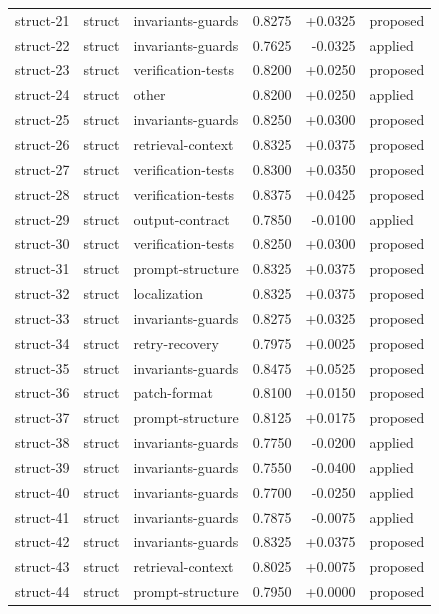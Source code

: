 \begin{center}
\begin{longtable}{llp{5.2cm}rrl}
struct-21 & struct & invariants-guards & 0.8275 & +0.0325 & proposed \\
struct-22 & struct & invariants-guards & 0.7625 & -0.0325 & applied \\
struct-23 & struct & verification-tests & 0.8200 & +0.0250 & proposed \\
struct-24 & struct & other & 0.8200 & +0.0250 & applied \\
struct-25 & struct & invariants-guards & 0.8250 & +0.0300 & proposed \\
struct-26 & struct & retrieval-context & 0.8325 & +0.0375 & proposed \\
struct-27 & struct & verification-tests & 0.8300 & +0.0350 & proposed \\
struct-28 & struct & verification-tests & 0.8375 & +0.0425 & proposed \\
struct-29 & struct & output-contract & 0.7850 & -0.0100 & applied \\
struct-30 & struct & verification-tests & 0.8250 & +0.0300 & proposed \\
struct-31 & struct & prompt-structure & 0.8325 & +0.0375 & proposed \\
struct-32 & struct & localization & 0.8325 & +0.0375 & proposed \\
struct-33 & struct & invariants-guards & 0.8275 & +0.0325 & proposed \\
struct-34 & struct & retry-recovery & 0.7975 & +0.0025 & proposed \\
struct-35 & struct & invariants-guards & 0.8475 & +0.0525 & proposed \\
struct-36 & struct & patch-format & 0.8100 & +0.0150 & proposed \\
struct-37 & struct & prompt-structure & 0.8125 & +0.0175 & proposed \\
struct-38 & struct & invariants-guards & 0.7750 & -0.0200 & applied \\
struct-39 & struct & invariants-guards & 0.7550 & -0.0400 & applied \\
struct-40 & struct & invariants-guards & 0.7700 & -0.0250 & applied \\
struct-41 & struct & invariants-guards & 0.7875 & -0.0075 & applied \\
struct-42 & struct & invariants-guards & 0.8325 & +0.0375 & proposed \\
struct-43 & struct & retrieval-context & 0.8025 & +0.0075 & proposed \\
struct-44 & struct & prompt-structure & 0.7950 & +0.0000 & proposed \\

\end{longtable}
\end{center}
